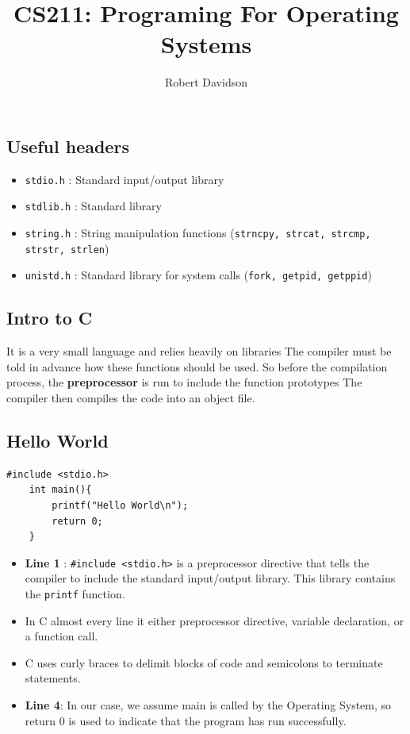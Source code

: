 \documentclass[a4paper, 10pt]{article}
\title{
\textbf{CS211: Programing For Operating Systems} \\ 
}
\author{
Robert Davidson
}
\date{}
\begin{document}
\maketitle
\pagebreak

\tableofcontents
\pagebreak
\subsection*{Useful headers}
\begin{itemize}
    \item \texttt{stdio.h} : Standard input/output library
    \item \texttt{stdlib.h} : Standard library
    \item  \texttt{string.h} : String manipulation functions (\texttt{strncpy, strcat, strcmp, strstr, strlen})
    \item \texttt{unistd.h} : Standard library for system calls (\texttt{fork, getpid, getppid})
\end{itemize}




\pagebreak
\subsection{Intro to C}

It is a very small language and relies heavily on libraries
The compiler must be told in advance how these functions should be used. So before the compilation process, the \textbf{preprocessor} is run to include the function prototypes The compiler then compiles the code into an object file.

\subsection{Hello World}
\begin{lstlisting}[style=cStyle, caption={Hello World in C}]
    #include <stdio.h>
    int main(){
        printf("Hello World\n");
        return 0;
    }
    \end{lstlisting}
\begin{itemize}
    \item \textbf{Line 1} : \texttt{\#include <stdio.h>} is a preprocessor directive that tells the compiler to include the standard input/output library. This library contains the \texttt{printf} function.
    \item In C almost every line it either preprocessor directive, variable declaration, or a function call.
    \item C uses curly braces to delimit blocks of code and semicolons to terminate statements.
    \item \textbf{Line 4}: In our case, we assume main is called by the Operating System, so return 0 is used to indicate that the program has run successfully.
\end{itemize}
\end{document}
